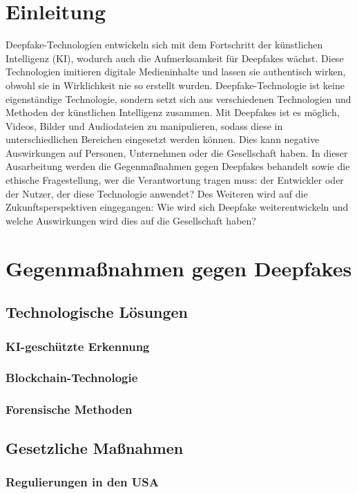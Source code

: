 \documentclass[a4paper,12pt]{article}
\begin{document}
\section{Einleitung}
Deepfake-Technologien entwickeln sich mit dem Fortschritt der künstlichen Intelligenz (KI), wodurch auch die Aufmerksamkeit für Deepfakes wächst.
Diese Technologien imitieren digitale Medieninhalte und lassen sie authentisch wirken, obwohl sie in Wirklichkeit nie so erstellt wurden.
Deepfake-Technologie ist keine eigenständige Technologie, sondern setzt sich aus verschiedenen Technologien und Methoden der künstlichen Intelligenz zusammen. \cite{BVDW2024}
Mit Deepfakes ist es möglich, Videos, Bilder und Audiodateien zu manipulieren, sodass diese in unterschiedlichen Bereichen eingesetzt werden können.
Dies kann negative Auswirkungen auf Personen, Unternehmen oder die Gesellschaft haben. \cite{CounterExtremism2020}
In dieser Ausarbeitung werden die Gegenmaßnahmen gegen Deepfakes behandelt sowie die ethische Fragestellung, wer die Verantwortung tragen muss: der Entwickler oder der Nutzer, der diese Technologie anwendet?
Des Weiteren wird auf die Zukunftsperspektiven eingegangen: Wie wird sich Deepfake weiterentwickeln und welche Auswirkungen wird dies auf die Gesellschaft haben?
\newpage
\section{Gegenmaßnahmen gegen Deepfakes}

\subsection{Technologische Lösungen}
\subsubsection{KI-geschützte Erkennung}
\subsubsection{Blockchain-Technologie}
\subsubsection{Forensische Methoden}
\subsection{Gesetzliche Maßnahmen}
\subsubsection{Regulierungen in den USA}
\end{document}
